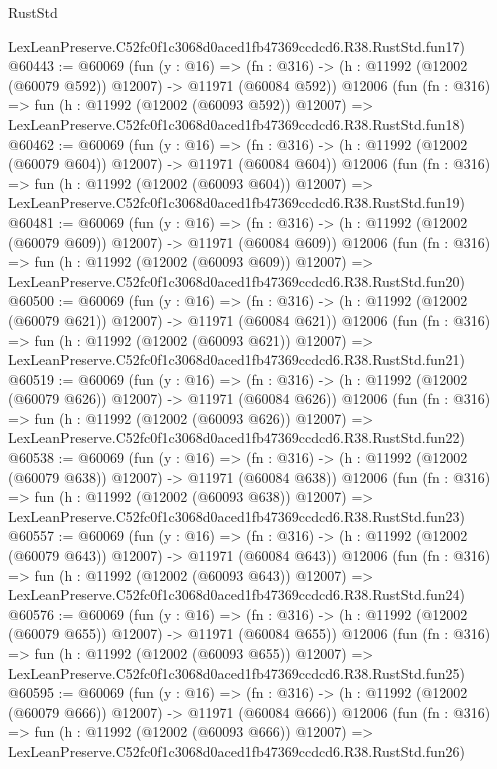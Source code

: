 \begin{lexlean}{RustStd}
\begin{coremodule}
    LexLeanPreserve.C52fc0f1c3068d0aced1fb47369ccdcd6.R38.RustStd.fun17)
@60443 := @60069
    (fun (y : @16) =>
    (fn : @316) -> (h : @11992 (@12002 (@60079 @592)) @12007) -> @11971 (@60084 @592))
    @12006
    (fun (fn : @316) =>
    fun (h : @11992 (@12002 (@60093 @592)) @12007) =>
    LexLeanPreserve.C52fc0f1c3068d0aced1fb47369ccdcd6.R38.RustStd.fun18)
@60462 := @60069
    (fun (y : @16) =>
    (fn : @316) -> (h : @11992 (@12002 (@60079 @604)) @12007) -> @11971 (@60084 @604))
    @12006
    (fun (fn : @316) =>
    fun (h : @11992 (@12002 (@60093 @604)) @12007) =>
    LexLeanPreserve.C52fc0f1c3068d0aced1fb47369ccdcd6.R38.RustStd.fun19)
@60481 := @60069
    (fun (y : @16) =>
    (fn : @316) -> (h : @11992 (@12002 (@60079 @609)) @12007) -> @11971 (@60084 @609))
    @12006
    (fun (fn : @316) =>
    fun (h : @11992 (@12002 (@60093 @609)) @12007) =>
    LexLeanPreserve.C52fc0f1c3068d0aced1fb47369ccdcd6.R38.RustStd.fun20)
@60500 := @60069
    (fun (y : @16) =>
    (fn : @316) -> (h : @11992 (@12002 (@60079 @621)) @12007) -> @11971 (@60084 @621))
    @12006
    (fun (fn : @316) =>
    fun (h : @11992 (@12002 (@60093 @621)) @12007) =>
    LexLeanPreserve.C52fc0f1c3068d0aced1fb47369ccdcd6.R38.RustStd.fun21)
@60519 := @60069
    (fun (y : @16) =>
    (fn : @316) -> (h : @11992 (@12002 (@60079 @626)) @12007) -> @11971 (@60084 @626))
    @12006
    (fun (fn : @316) =>
    fun (h : @11992 (@12002 (@60093 @626)) @12007) =>
    LexLeanPreserve.C52fc0f1c3068d0aced1fb47369ccdcd6.R38.RustStd.fun22)
@60538 := @60069
    (fun (y : @16) =>
    (fn : @316) -> (h : @11992 (@12002 (@60079 @638)) @12007) -> @11971 (@60084 @638))
    @12006
    (fun (fn : @316) =>
    fun (h : @11992 (@12002 (@60093 @638)) @12007) =>
    LexLeanPreserve.C52fc0f1c3068d0aced1fb47369ccdcd6.R38.RustStd.fun23)
@60557 := @60069
    (fun (y : @16) =>
    (fn : @316) -> (h : @11992 (@12002 (@60079 @643)) @12007) -> @11971 (@60084 @643))
    @12006
    (fun (fn : @316) =>
    fun (h : @11992 (@12002 (@60093 @643)) @12007) =>
    LexLeanPreserve.C52fc0f1c3068d0aced1fb47369ccdcd6.R38.RustStd.fun24)
@60576 := @60069
    (fun (y : @16) =>
    (fn : @316) -> (h : @11992 (@12002 (@60079 @655)) @12007) -> @11971 (@60084 @655))
    @12006
    (fun (fn : @316) =>
    fun (h : @11992 (@12002 (@60093 @655)) @12007) =>
    LexLeanPreserve.C52fc0f1c3068d0aced1fb47369ccdcd6.R38.RustStd.fun25)
@60595 := @60069
    (fun (y : @16) =>
    (fn : @316) -> (h : @11992 (@12002 (@60079 @666)) @12007) -> @11971 (@60084 @666))
    @12006
    (fun (fn : @316) =>
    fun (h : @11992 (@12002 (@60093 @666)) @12007) =>
    LexLeanPreserve.C52fc0f1c3068d0aced1fb47369ccdcd6.R38.RustStd.fun26)

\end{coremodule}
\end{lexlean}
